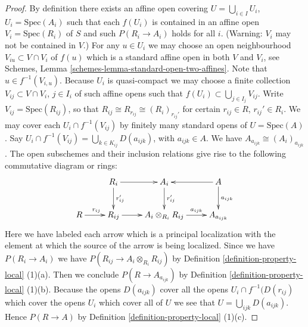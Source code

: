 \begin{proof}
By definition there exists an affine open covering
$U = \bigcup_{i \in I} U_i$, $U_i = \text{Spec}(A_i)$ such that each $f(U_i)$
is contained in an affine open $V_i = \text{Spec}(R_i)$ of $S$
and such $P(R_i \to A_i)$ holds for all $i$.
(Warning: $V_i$ may not be contained in $V$.)
For any $u \in U_i$ we may choose an open neighbourhood
$V_{iu} \subset V \cap V_i$ of $f(u)$ which is a standard affine
open in both $V$ and $V_i$, see
Schemes, Lemma \ref{schemes-lemma-standard-open-two-affines}.
Note that $u \in f^{-1}(V_{i, u})$.
Because $U_i$ is quasi-compact we may choose a finite
collection $V_{ij} \subset V \cap V_i$, $j \in I_i$ of such affine opens
such that $f(U_i) \subset \bigcup_{j \in I_j} V_{ij}$.
Write $V_{ij} = \text{Spec}(R_{ij})$, so that
$R_{ij} \cong R_{r_{ij}} \cong (R_i)_{r_{ij}'}$ for certain
$r_{ij} \in R$, $r_{ij}' \in R_i$.
We may cover each $U_i \cap f^{-1}(V_{ij})$
by finitely many standard opens of $U = \text{Spec}(A)$.
Say $U_i \cap f^{-1}(V_{ij}) = \bigcup_{k \in K_{ij}} D(a_{ijk})$,
with $a_{ijk} \in A$. We have $A_{a_{ijk}} \cong (A_i)_{a_{ijk}}$.
The open subschemes and their inclusion relations give rise
to the following commutative diagram or rings:
$$
\xymatrix{
& R_i \ar[r] \ar[d]^{r_{ij}'} & A_i \ar[d]^{r_{ij}'}
& A \ar[l] \ar[d]^{a_{ijk}}\\
R \ar[r]^{r_{ij}} & R_{ij} \ar[r] & A_i \otimes_{R_i} R_{ij} \ar[r]^-{a_{ijk}}
& A_{a_{ijk}}
}
$$
Here we have labeled each arrow which is a principal localization with
the element at which the source of the arrow is being localized.
Since we have $P(R_i \to A_i)$ we have
$P(R_{ij} \to A_i \otimes_{R_i} R_{ij})$ by
Definition \ref{definition-property-local} (1)(a).
Then we conclude $P(R \to A_{a_{ijk}})$ by
Definition \ref{definition-property-local} (1)(b).
Because the opens $D(a_{ijk})$ cover all the opens
$U_i \cap f^{-1}(D(r_{ij})$ which cover the opens $U_i$
which cover all of $U$ we see that $U = \bigcup_{ijk} D(a_{ijk})$.
Hence $P(R \to A)$ by Definition \ref{definition-property-local} (1)(c).
\end{proof}

